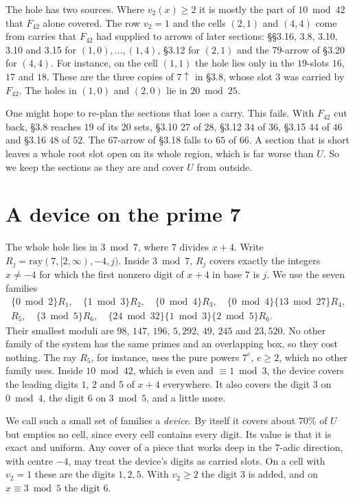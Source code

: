 \documentclass[11pt]{amsart}
\theoremstyle{definition}
\theoremstyle{remark}
\newcommand{\up}{{\uparrow}}
\newcommand{\ray}{\mathrm{ray}}
\begin{document}
The hole has two sources. Where $v_2(x)\ge2$ it is mostly the part of $10 \bmod 42$ that $F_{42}$ alone covered. The
row $v_2=1$ and the cells $(2,1)$ and $(4,4)$ come from carries that $F_{42}$ had supplied to arrows of later
sections: §§3.16, 3.8, 3.10, 3.10 and 3.15 for $(1,0),\dots,(1,4)$, §3.12 for $(2,1)$ and the $79$-arrow of §3.20
for $(4,4)$. For instance, on the cell $(1,1)$ the hole lies only in the $19$-slots $16$, $17$ and $18$. These are the
three copies of $7\up$ in §3.8, whose slot $3$ was carried by $F_{42}$. The holes in $(1,0)$ and $(2,0)$ lie in
$20 \bmod 25$.

One might hope to re-plan the sections that lose a carry. This fails. With $F_{42}$ cut back, §3.8 reaches $19$ of its
$20$ sets, §3.10 $27$ of $28$, §3.12 $34$ of $36$, §3.15 $44$ of $46$ and §3.16 $48$ of $52$. The $67$-arrow of
§3.18 falls to $65$ of $66$. A section that is short leaves a whole root slot open on its whole region, which is far
worse than $U$. So we keep the sections as they are and cover $U$ from outside.

\section{A device on the prime 7}\label{sec:device}

The whole hole lies in $3 \bmod 7$, where $7$ divides $x+4$. Write $R_j=\ray(7,[2,\infty),-4,j)$. Inside
$3 \bmod 7$, $R_j$ covers exactly the integers $x\ne-4$ for which the first nonzero digit of $x+4$ in base $7$ is $j$.
We use the seven families
\begin{gather*}
\{0 \bmod 2\}R_1,\quad \{1 \bmod 3\}R_2,\quad \{0 \bmod 4\}R_3,\quad \{0 \bmod 4\}\{13 \bmod 27\}R_4,\\
R_5,\quad \{3 \bmod 5\}R_6,\quad \{24 \bmod 32\}\{1 \bmod 3\}\{2 \bmod 5\}R_6.
\end{gather*}
Their smallest moduli are $98$, $147$, $196$, $5{,}292$, $49$, $245$ and $23{,}520$. No other family of the system
has the same primes and an overlapping box, so they cost nothing. The ray $R_5$, for instance, uses the pure powers
$7^e$, $e\ge2$, which no other family uses. Inside $10 \bmod 42$, which is even and $\equiv 1 \bmod 3$,
the device covers the leading digits $1$, $2$ and $5$ of $x+4$ everywhere. It also covers the digit $3$ on
$0 \bmod 4$, the digit $6$ on $3 \bmod 5$, and a little more.

We call such a small set of families a \emph{device}. By itself it covers about $70\%$ of $U$ but empties no cell,
since every cell contains every digit. Its value is that it is exact and uniform. Any cover of a piece that works deep
in the $7$-adic direction, with centre $-4$, may treat the device's digits as carried slots. On a cell with
$v_2=1$ these are the digits $1,2,5$. With $v_2\ge2$ the digit $3$ is added, and on $x\equiv3\bmod5$ the digit $6$.
\end{document}
